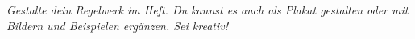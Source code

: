 \documentclass[12pt, a4paper]{article}
\begin{document}
    \vspace{0.5cm}

    \colorbox{boxcolor}{%
        \begin{minipage}{\dimexpr\linewidth-2\fboxsep\relax}
            \textit{Gestalte dein Regelwerk im Heft. Du kannst es auch als Plakat gestalten oder mit Bildern und Beispielen ergänzen. Sei kreativ!}
        \end{minipage}%
    }

    \vspace{0.5cm}
\end{document}
